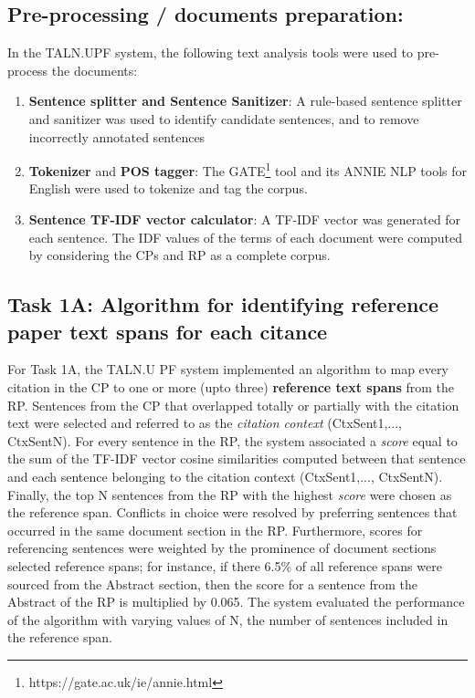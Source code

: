 \documentclass[11pt]{article}
\begin{document}
\subsection{Pre-processing / documents preparation:}
In the TALN.UPF system, the following text analysis tools were used to pre-process the documents:
\begin{enumerate}
\vspace{-.3cm}
\item \textbf{Sentence splitter and Sentence Sanitizer}: A rule-based sentence splitter and sanitizer was used to identify candidate sentences, and to remove incorrectly annotated sentences
\vspace{-.3cm}
\item \textbf{Tokenizer} and \textbf{POS tagger}: The GATE\footnote{https://gate.ac.uk/ie/annie.html} tool and its ANNIE NLP tools for English were used to tokenize and tag the corpus.
\vspace{-.3cm}
\item \textbf{Sentence TF-IDF vector calculator}: A TF-IDF vector was generated for each sentence. The IDF values of the terms of each document were computed by considering the CPs and RP as a complete corpus.
\vspace{-.3cm}
\end{enumerate}

\subsection{Task 1A: Algorithm for identifying reference paper 
  text spans for each citance}
For Task 1A, the TALN.U	PF system implemented an algorithm to 
map every citation in the CP to one or more (upto three) 
\textbf{reference text spans} from the RP. Sentences from the CP 
that overlapped totally or partially with the citation text were 
selected and referred to as the \textit{citation context} 
(CtxSent1,..., CtxSentN). For every sentence in the RP, the system 
associated a \textit{score} equal to the sum of the TF-IDF vector 
cosine similarities computed between that sentence and each sentence 
belonging to the citation context (CtxSent1,..., CtxSentN). Finally, 
the top N sentences from the RP with the highest \textit{score} were 
chosen as the reference span. Conflicts in choice were resolved by 
preferring sentences that occurred in the same document section in 
the RP. 
Furthermore, scores for referencing sentences were weighted 
by the prominence of document sections selected reference spans; 
for instance, if there 6.5\% of all reference spans were sourced from the
Abstract section, then the score for a sentence from the Abstract 
of the RP is multiplied by 0.065. The system evaluated the performance 
of the algorithm with varying values of N, the number of sentences 
included in the reference span.
\end{document}
